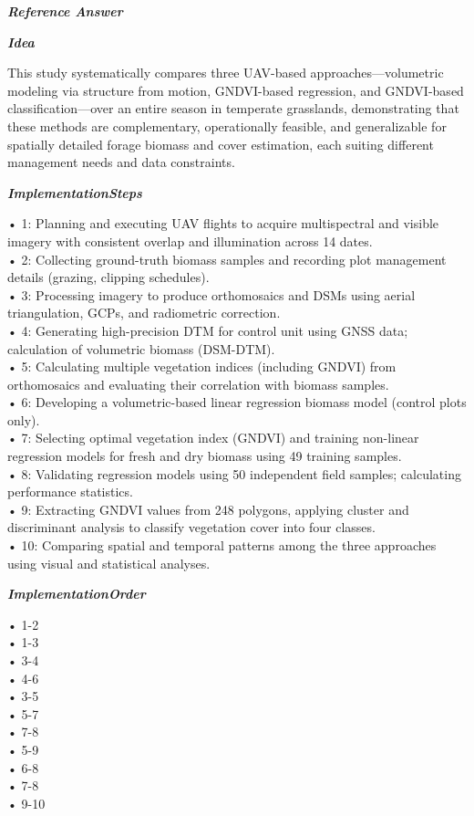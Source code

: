 \begin{tcolorbox}[
    breakable,
    title={Example of Idea Generation in Earth},
    colback=LighterGray,
    colframe=DeepPurple,
    colbacktitle=DeepPurple,
    coltitle=White,
]
\textbf{\emph{\textcolor{DeepPurple}{Reference Answer}}}

\textbf{\emph{\textcolor{CaseOrange}{Idea}}}

This study systematically compares three UAV-based approaches—volumetric modeling via structure from
motion, GNDVI-based regression, and GNDVI-based classification—over an entire season in temperate
grasslands, demonstrating that these methods are complementary, operationally feasible, and
generalizable for spatially detailed forage biomass and cover estimation, each suiting different
management needs and data constraints.

\textbf{\emph{\textcolor{CaseOrange}{ImplementationSteps}}}

• 1: Planning and executing UAV flights to acquire multispectral and visible imagery with consistent overlap and illumination across 14 dates. \\
• 2: Collecting ground-truth biomass samples and recording plot management details (grazing, clipping schedules). \\
• 3: Processing imagery to produce orthomosaics and DSMs using aerial triangulation, GCPs, and radiometric correction. \\
• 4: Generating high-precision DTM for control unit using GNSS data; calculation of volumetric biomass (DSM-DTM). \\
• 5: Calculating multiple vegetation indices (including GNDVI) from orthomosaics and evaluating their correlation with biomass samples. \\
• 6: Developing a volumetric-based linear regression biomass model (control plots only). \\
• 7: Selecting optimal vegetation index (GNDVI) and training non-linear regression models for fresh and dry biomass using 49 training samples. \\
• 8: Validating regression models using 50 independent field samples; calculating performance statistics. \\
• 9: Extracting GNDVI values from 248 polygons, applying cluster and discriminant analysis to classify vegetation cover into four classes. \\
• 10: Comparing spatial and temporal patterns among the three approaches using visual and statistical analyses. 

\textbf{\emph{\textcolor{CaseOrange}{ImplementationOrder}}}

• 1-2 \\
• 1-3 \\
• 3-4 \\
• 4-6 \\
• 3-5 \\
• 5-7 \\
• 7-8 \\
• 5-9 \\
• 6-8 \\
• 7-8 \\
• 9-10 


\end{tcolorbox}
